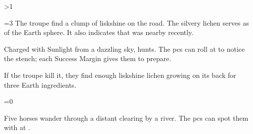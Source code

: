 \ifnum\value{temperature}>1

\ifnum\value{temperature}=3
  The troupe find a clump of liskshine on the road.
  The silvery lichen serves as  of the Earth \gls{sphere}.
  It also indicates that  was nearby recently.
\fi

\basilisk

Charged with Sunlight from a dazzling sky,  hunts.
The \glspl{pc} can roll  at \tn[5] to notice the stench; each Success Margin gives them  to prepare.

If the troupe kill it, they find enough liskshine lichen growing on its back for three Earth \glspl{ingredient}.%

\else

\ifnum\value{temperature}=0
\fi

Five horses wander through a distant clearing by a river.
The \glspl{pc} can spot them with  at \tn[10].


\fi
